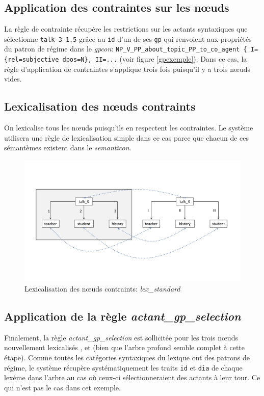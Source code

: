 \subsection{Application des contraintes sur les n\oe{}uds}
La règle de contrainte récupère les restrictions sur les actants syntaxiques que sélectionne \texttt{talk-3-1.5} grâce au \texttt{id} d'un de ses \texttt{gp} qui renvoient aux propriétés du patron de régime dans le \emph{gpcon}: \lstinline|NP_V_PP_about_topic_PP_to_co_agent { I={rel=subjective dpos=N}, II=...| (voir figure \ref{gpexemple}). Dans ce cas, la règle d'application de contraintes s'applique trois fois puisqu'il y a trois n\oe{}uds vides.

\subsection{Lexicalisation des n\oe{}uds contraints}
On lexicalise tous les n\oe{}uds puisqu'ils en respectent les contraintes. Le système utilisera une règle de lexicalisation simple dans ce cas parce que chacun de ces sémantèmes existent dans le \emph{semanticon}.

\begin{figure}[htb]
	\centering
	\includegraphics[width=1\textwidth, trim = {0cm 3.6cm 0cm 4.6cm},clip]{ch6/figs/actant_gp_lexical.pdf}
	\caption{Lexicalisation des n\oe{}uds contraints: \emph{lex\_standard}}
	\label{deroulement3}
\end{figure}

\subsection{Application de la règle \emph{actant\_gp\_selection}}
Finalement, la règle \emph{actant\_gp\_selection} est sollicitée pour les trois n\oe{}uds nouvellement lexicalisés ,  et  (bien que l'arbre profond semble complet à cette étape). Comme toutes les catégories syntaxiques du lexique ont des patrons de régime, le système récupère systématiquement les traits \texttt{id} et \texttt{dia} de chaque lexème dans l'arbre au cas où ceux-ci sélectionneraient des actants à leur tour. Ce qui n'est pas le cas dans cet exemple.

